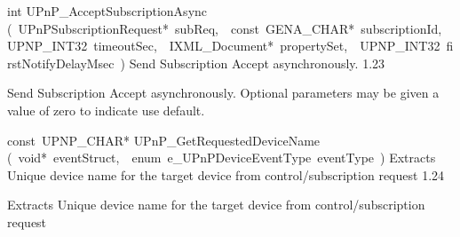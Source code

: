 \documentclass{article}
\begin{document}
\begin{cxxentry}
\begin{cxxfunction}
\begin{cxxdoc}
\end{cxxdoc}
\end{cxxfunction}
\begin{cxxfunction}
{int}
        {UPnP\_AcceptSubscriptionAsync}
        {(\ UPnPSubscriptionRequest*\ subReq,\ \ const\ GENA\_CHAR*\ subscriptionId,\ \ UPNP\_INT32\ timeoutSec,\ \ IXML\_Document*\ propertySet,\ \ UPNP\_INT32\ firstNotifyDelayMsec\ )}
        {Send Subscription Accept asynchronously.}
        {1.23}
\begin{cxxdoc}
Send Subscription Accept asynchronously. Optional parameters may be given
a value of zero to indicate use default.


\end{cxxdoc}
\end{cxxfunction}
\begin{cxxfunction}
{const\ UPNP\_CHAR*}
        {UPnP\_GetRequestedDeviceName}
        {(\ void*\ eventStruct,\ \ enum\ e\_UPnPDeviceEventType\ eventType\ )}
        {Extracts Unique device name for the target device from control/subscription request}
        {1.24}
\begin{cxxdoc}
Extracts Unique device name for the target device from control/subscription request



\end{cxxdoc}
\end{cxxfunction}
\end{cxxentry}
\end{document}
